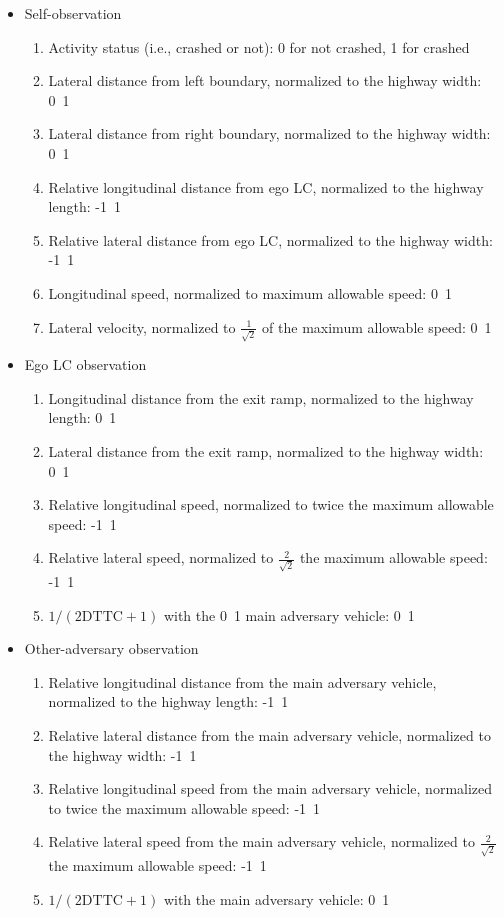 \documentclass[12pt, a4paper]{report}
\begin{document}
\begin{itemize}
    \item Self-observation
    \begin{enumerate}
        \item Activity status (i.e., crashed or not): 0 for not crashed, 1 for crashed
        \item Lateral distance from left boundary, normalized to the highway width: 0~1
        \item Lateral distance from right boundary, normalized to the highway width: 0~1
        \item Relative longitudinal distance from ego LC, normalized to the highway length: -1~1
        \item Relative lateral distance from ego LC, normalized to the highway width: -1~1
        \item Longitudinal speed, normalized to maximum allowable speed: 0~1
        \item Lateral velocity, normalized to $\frac{1}{\sqrt{2}}$ of the maximum allowable speed: 0~1
    \end{enumerate}
    \item Ego LC observation
    \begin{enumerate}
        \item Longitudinal distance from the exit ramp, normalized to the highway length: 0~1
        \item Lateral distance from the exit ramp, normalized to the highway width: 0~1
        \item Relative longitudinal speed, normalized to twice the maximum allowable speed: -1~1
        \item Relative lateral speed, normalized to $\frac{2}{\sqrt{2}}$ the maximum allowable speed: -1~1
        \item $1/(\mathrm{2D TTC} + 1)$ with the 0~1 main adversary vehicle: 0~1
    \end{enumerate}
    \item Other-adversary observation
    \begin{enumerate}
        \item Relative longitudinal distance from the main adversary vehicle, normalized to the highway length: -1~1
        \item Relative lateral distance from the main adversary vehicle, normalized to the highway width: -1~1
        \item Relative longitudinal speed from the main adversary vehicle, normalized to twice the maximum allowable speed: -1~1
        \item Relative lateral speed from the main adversary vehicle, normalized to $\frac{2}{\sqrt{2}}$ the maximum allowable speed: -1~1
        \item $1/(\mathrm{2D TTC} + 1)$ with the main adversary vehicle: 0~1
    \end{enumerate}
\end{itemize}
\end{document}
